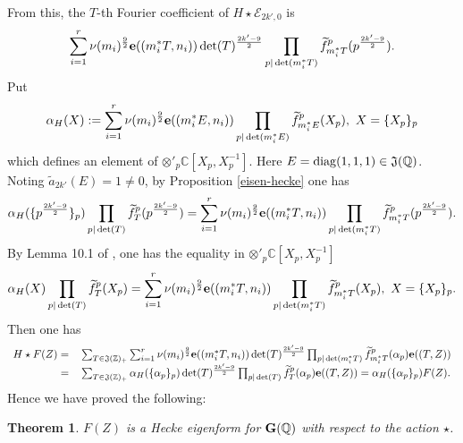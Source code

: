 \documentclass[11pt]{amsart}
\numberwithin{equation}{section}
\newtheorem{theorem}{Theorem}[section]
\theoremstyle{definition}
\begin{document}
From this, the $T$-th Fourier coefficient of $H\star \mathcal{E}_{2k',0}$ is 
$$\sum_{i=1}^r\nu(m_i)^{\frac{9}{2}} \bold e((m^\ast_i T,n_i))
\det(T)^{\frac{2k'-9}{2}}\prod_{p|\det(m^\ast_i T)}\widetilde{f}^p_{m^\ast_i T}(p^{\frac{2k'-9}{2}}).$$
Put $$\alpha_H(X):=\sum_{i=1}^r\nu(m_i)^{\frac{9}{2}} \bold e((m^\ast_i E,n_i))
\prod_{p|\det(m^\ast_i  E)}\widetilde{f}^p_{m^\ast_i  E}(X_p),\ X=\{X_p\}_p$$
which defines an element of $\otimes'_p{\mathbb{C}}[X_p,X^{-1}_p]$. Here $E={\rm diag}(1,1,1)\in \frak J({\mathbb{Q}})$.  
Noting $\widetilde{a}_{2k'}(E)=1\not=0$, by Proposition \ref{eisen-hecke} one has 
$$\alpha_H(\{p^{\frac{2k'-9}{2}}\}_p)\prod_{p|\det(T)}\widetilde{f}^p_T(p^{\frac{2k'-9}{2}})
=\sum_{i=1}^r\nu(m_i)^{\frac{9}{2}} \bold e((m^\ast_i T,n_i))
\prod_{p|\det(m^\ast_i T)}\widetilde{f}^p_{m^\ast_i T}(p^{\frac{2k'-9}{2}}).$$
By Lemma 10.1 of \cite{Ik1}, one has the equality in $\otimes'_p{\mathbb{C}}[X_p,X^{-1}_p]$ 
$$\alpha_H(X)\prod_{p|\det(T)}\widetilde{f}^p_T(X_p)
=\sum_{i=1}^r\nu(m_i)^{\frac{9}{2}} \bold e((m^\ast_i T,n_i))
\prod_{p|\det(m^\ast_i T)}\widetilde{f}^p_{m^\ast_i T}(X_p),\ X=\{X_p\}_p.$$   
Then one has 
$$
\begin{array}{rl}
H\star F(Z)=&
{\displaystyle}\sum_{T\in \frak J({\mathbb{Z}})_+} \sum_{i=1}^r\nu(m_i)^{\frac{9}{2}} \bold e((m^\ast_i T,n_i))
\det(T)^{\frac{2k'-9}{2}}\prod_{p|\det(m^\ast_i T)}\widetilde{f}^p_{m^\ast_i T}(\alpha_p) \bold e((T,Z))\\
=&
{\displaystyle}\sum_{T\in \frak J({\mathbb{Z}})_+ }\alpha_H(\{\alpha_p\}_p)
\det(T)^{\frac{2k'-9}{2}}\prod_{p|\det(T)}\widetilde{f}^p_{T}(\alpha_p) \bold e((T,Z))
=\alpha_H(\{\alpha_p\}_p)F(Z). 
\end{array}
$$
Hence we have proved the following:
\begin{theorem}\label{hecke-eigen} $F(Z)$ is a Hecke eigenform for $\bold{G}({\mathbb{Q}})$ with respect to the action $\star$.
\end{theorem}
\end{document}
